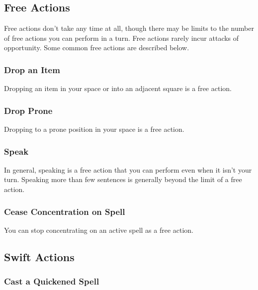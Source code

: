 \subsection{Free Actions}

Free actions don't take any time at all, though there may be limits to the number 
of free actions you can perform in a turn. Free actions rarely incur attacks of 
opportunity. Some common free actions are described below.

\subsubsection{Drop an Item}

Dropping an item in your space or into an adjacent square is a free action.

\subsubsection{Drop Prone}

Dropping to a prone position in your space is a free action.

\subsubsection{Speak}

In general, speaking is a free action that you can perform even when it isn't your 
turn. Speaking more than few sentences is generally beyond the limit of a free 
action.

\subsubsection{Cease Concentration on Spell}

You can stop concentrating on an active spell as a free action.

\subsection{Swift Actions}

\subsubsection{Cast a Quickened Spell}

